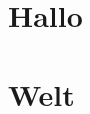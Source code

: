 \documentclass[12pt,ngerman]{scrartcl}
\begin{document}
\tableofcontents

\section{Hallo}

\blindtext[2]

\section*{Welt}
\end{document}
